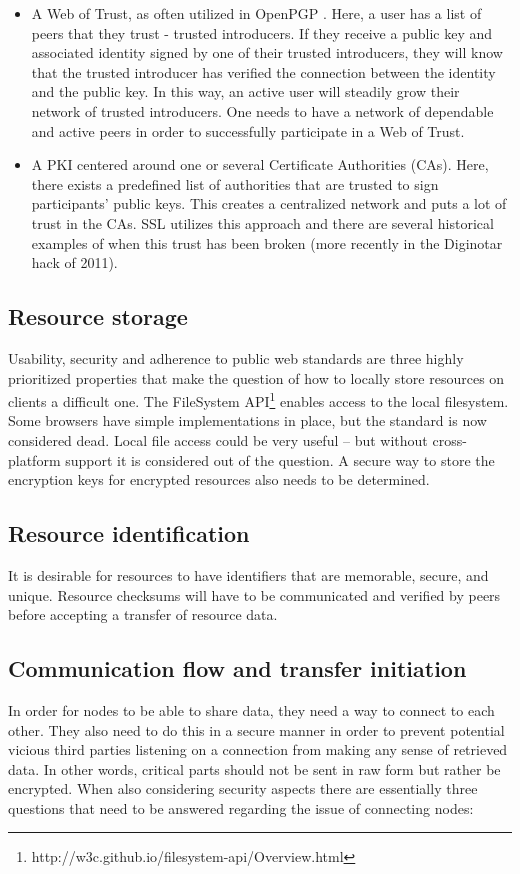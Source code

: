 \begin{itemize}
 \item A Web of Trust, as often utilized in OpenPGP \cite{Maurer:1996}. Here, a user has a list of peers that they trust - trusted introducers. If they receive a public key and associated identity signed by one of their trusted introducers, they will know that the trusted introducer has verified the connection between the identity and the public key. In this way, an active user will steadily grow their network of trusted introducers. One needs to have a network of dependable and active peers in order to successfully participate in a Web of Trust.

\item A PKI centered around one or several Certificate Authorities (CAs). Here, there exists a predefined list of authorities that are trusted to sign participants' public keys. This creates a centralized network and puts a lot of trust in the CAs. SSL utilizes this approach and there are several historical examples of when this trust has been broken (more recently in the Diginotar hack of 2011).
\end{itemize}

\subsection{Resource storage}
Usability, security and adherence to public web standards are three highly prioritized properties that make the question of how to locally store resources on clients a difficult one. The FileSystem API\footnote{http://w3c.github.io/filesystem-api/Overview.html} enables access to the local filesystem. Some browsers have simple implementations in place, but the standard is now considered dead\cite{W3C:2014}. Local file access could be very useful – but without cross-platform support it is considered out of the question. A secure way to store the encryption keys for encrypted resources also needs to be determined.

\subsection{Resource identification}
It is desirable for resources to have identifiers that are memorable, secure, and unique. Resource checksums will have to be communicated and verified by peers before accepting a transfer of resource data.

\subsection{Communication flow and transfer initiation}
In order for nodes to be able to share data, they need a way to connect to each other. They also need to do this in a secure manner in order to prevent potential vicious third parties listening on a connection from making any sense of retrieved data. In other words, critical parts should not be sent in raw form but rather be encrypted. When also considering security aspects there are essentially three questions that need to be answered regarding the issue of connecting nodes:

